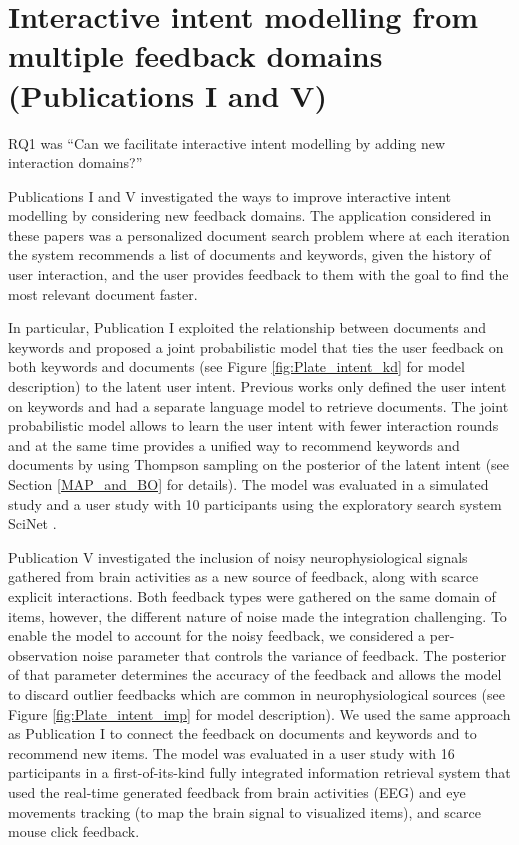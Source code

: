 \documentclass[dissertation,math,vertlayout,pdfa,colorlinks]{aaltoseries}
\begin{document}
\section{Interactive intent modelling from multiple feedback domains (Publications I and V)}


RQ1 was ``Can we facilitate interactive intent modelling by adding new interaction domains?''

Publications I and V investigated the ways to improve interactive intent modelling by considering new feedback domains. The application considered in these papers was a personalized document search problem where at each iteration the system recommends a list of documents and keywords, given the history of user interaction, and the user provides feedback to them with the goal to find the most relevant document faster.

In particular, Publication I exploited the relationship between documents and keywords and proposed a joint probabilistic model that ties the user feedback on both keywords and documents (see Figure \ref{fig:Plate_intent_kd} for model description) to the latent user intent. Previous works \cite{GlowIUI2013,ruotsalo2015interactive} only defined the user intent on keywords and had a separate language model to retrieve documents. The joint probabilistic model allows to learn the user intent with fewer interaction rounds and at the same time provides a unified way to recommend keywords and documents by using Thompson sampling on the posterior of the latent intent (see Section \ref{MAP_and_BO} for details). The model was evaluated in a simulated study and a user study with 10 participants using the exploratory search system SciNet \cite{GlowIUI2013}. 

Publication V investigated the inclusion of noisy neurophysiological signals gathered from brain activities as a new source of feedback, along with scarce explicit interactions. Both feedback types were gathered on the same domain of items, however, the different nature of noise made the integration challenging.  
To enable the model to account for the noisy feedback, we considered a per-observation noise parameter that controls the variance of feedback. 
The posterior of that parameter determines the accuracy of the feedback and allows the model to discard outlier feedbacks which are common in neurophysiological sources (see Figure \ref{fig:Plate_intent_imp} for model description). We used the same approach as Publication I to connect the feedback on documents and keywords and to recommend new items. The model was evaluated in a user study with 16 participants in a first-of-its-kind fully integrated information retrieval system that used the real-time generated feedback from brain activities (EEG) and eye movements tracking (to map the brain signal to visualized items), and scarce mouse click feedback.
\end{document}
